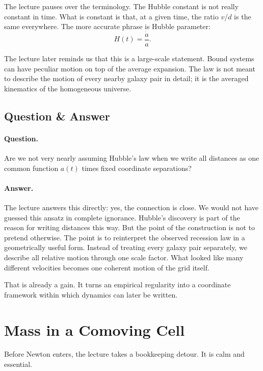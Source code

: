The lecture pauses over the terminology. The Hubble constant is not really constant in time. What is constant is that, at a given time, the ratio \(v/d\) is the same everywhere. The more accurate phrase is Hubble parameter:
\begin{equation}
H(t)=\frac{\dot a}{a}.
\end{equation}

The lecture later reminds us that this is a large-scale statement. Bound systems can have peculiar motion on top of the average expansion. The law is not meant to describe the motion of every nearby galaxy pair in detail; it is the averaged kinematics of the homogeneous universe.

\subsection{Question \& Answer}

\paragraph{Question.} Are we not very nearly assuming Hubble's law when we write all distances as one common function \(a(t)\) times fixed coordinate separations?

\paragraph{Answer.} The lecture answers this directly: yes, the connection is close. We would not have guessed this ansatz in complete ignorance. Hubble's discovery is part of the reason for writing distances this way. But the point of the construction is not to pretend otherwise. The point is to reinterpret the observed recession law in a geometrically useful form. Instead of treating every galaxy pair separately, we describe all relative motion through one scale factor. What looked like many different velocities becomes one coherent motion of the grid itself.

That is already a gain. It turns an empirical regularity into a coordinate framework within which dynamics can later be written.

\section{Mass in a Comoving Cell}

Before Newton enters, the lecture takes a bookkeeping detour. It is calm and essential.

